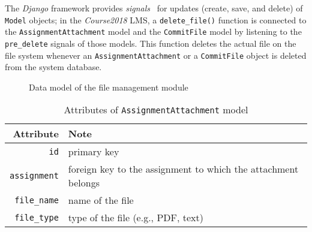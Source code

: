 The \emph{Django} framework provides \emph{signals}~\cite{djangoSignal}
for updates (create, save, and delete) of \texttt{Model} objects; in the
\emph{Course2018} LMS, a \texttt{delete\_file()} function is connected to
the \texttt{AssignmentAttachment} model and the \texttt{CommitFile} model by
listening to the \texttt{pre\_delete} signals of those models. This function
deletes the actual file on the file system whenever an
\texttt{AssignmentAttachment} or a \texttt{CommitFile} object is deleted from
the system database.

\begin{figure}[ht]
    \centering
    \usetikzlibrary{er}


    \caption{Data model of the file management module}
    \label{fig:FILES_ER}
\end{figure}

\begin{table}[ht]
    \centering
    \caption{Attributes of \texttt{AssignmentAttachment} model}
    \label{tab:ATTACH_FILE_ATTR}
    \renewcommand{\arraystretch}{1.3}
    \begin{tabular}[ht]{r|l}
        \hline
        Attribute & Note \\
        \hline
        \hline
        \texttt{id} & primary key \\
        \hline
        \texttt{assignment} & foreign key to the assignment to which the
            attachment belongs \\
        \hline
        \texttt{file\_name} & name of the file\\
        \hline
        \texttt{file\_type} & type of the file (e.g., PDF, text) \\
        \hline
    \end{tabular}
\end{table}

